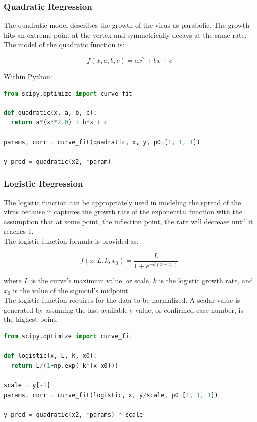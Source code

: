 \documentclass{homework}
\begin{document}
\subsubsection{Quadratic Regression}

The quadratic model describes the growth of the virus as parabolic. The growth hits an extreme point at the vertex and symmetrically decays at the same rate. The model of the quadratic function is:

\begin{equation}
  f(x, a, b, c) = ax^2 + bx + c
\end{equation}

Within Python:

\begin{lstlisting}[language=Python, caption={Quadratic Model}, firstnumber=168]
from scipy.optimize import curve_fit
  
def quadratic(x, a, b, c):
  return a*(x**2.0) + b*x + c
  
params, corr = curve_fit(quadratic, x, y, p0=[1, 1, 1])

y_pred = quadratic(x2, *param)
\end{lstlisting}

\subsubsection{Logistic Regression}

The logistic function can be appropriately used in modeling the spread of the virus because it captures the growth rate of the exponential function with the assumption that at some point, the inflection point, the rate will decrease until it reaches 1. \\

The logistic function formula is provided as:

\begin{equation}
  f(x, L, k, x_0) = \frac{L}{1+e^{-k(x-x_0)}}
\end{equation}

where $L$ is the curve's maximum value, or scale, $k$ is the logistic growth rate, and $x_0$ is the value of the sigmoid's midpoint \cite{albon_2018}.\\

The logistic function requires for the data to be normalized. A scalar value is generated by assuming the last available y-value, or confirmed case number, is the highest point.

\begin{lstlisting}[language=Python, caption={Logistic Model}, firstnumber=187]
from scipy.optimize import curve_fit
    
def logistic(x, L, k, x0):
  return L/(1+np.exp(-k*(x-x0)))
    
scale = y[-1]
params, corr = curve_fit(logistic, x, y/scale, p0=[1, 1, 1])
  
y_pred = quadratic(x2, *params) * scale
\end{lstlisting}
\end{document}
